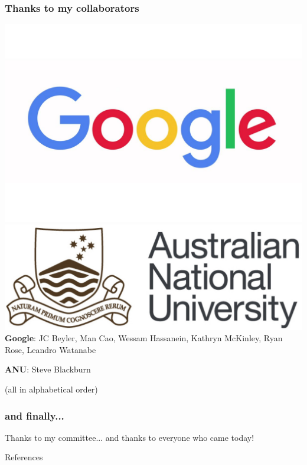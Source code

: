 \documentclass[11pt]{beamer}
\begin{document}
\begin{frame}
  \frametitle{Thanks to my collaborators}
  \includegraphics[scale=0.1]{google.jpg}
  \hspace*{\fill}
  \includegraphics[scale=0.1]{anu.jpeg}\\
  
  \textbf{Google}: JC Beyler, Man Cao, Wessam Hassanein, Kathryn McKinley, Ryan Rose,
  Leandro Watanabe
  
  \textbf{ANU}: Steve Blackburn

  (all in alphabetical order)
\end{frame}

\begin{frame}
  \frametitle{and finally...}
  Thanks to my committee...
  \pause
  \newline
  and thanks to everyone who came today!
\end{frame}

\begin{frame}[allowframebreaks]{References}
  \def\newblock{}
  
  
\end{frame}
\end{document}
